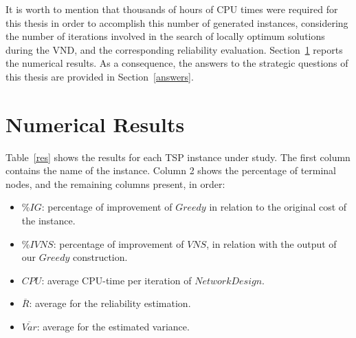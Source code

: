 It is worth to mention that thousands of hours of CPU times were required for this thesis 
in order to accomplish this number of generated instances, considering the number of iterations involved in the search of locally optimum solutions during the VND, and the corresponding reliability evaluation. 
Section~\ref{results:2} reports the numerical results. As a consequence, the answers to the strategic 
questions of this thesis are provided in Section~\ref{answers}. 


\section{Numerical Results} \label{results:2}
Table~\ref{res} shows the results for each TSP instance under study. The first column contains the name of the instance. Column 2 shows the percentage of terminal nodes, and the remaining columns present, in order:
\begin{itemize}
\item \%$IG$: percentage of improvement of $Greedy$ in relation to the original cost of the instance.
\item \%$IVNS$: percentage of improvement of $VNS$, in relation with the output of our $Greedy$ construction.
\item $CPU$: average CPU-time per iteration of $NetworkDesign$. %
\item $\overline{R}$: average for the reliability estimation. 
\item $\overline{Var}$: average for the estimated variance.
\end{itemize} 

